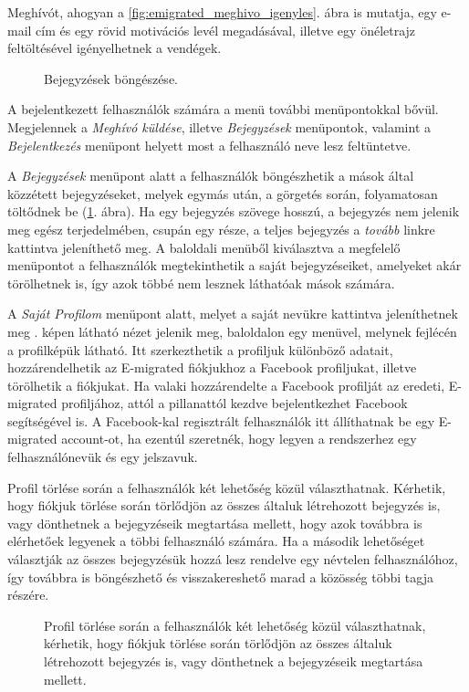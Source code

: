 Meghívót, ahogyan a \ref{fig:emigrated_meghivo_igenyles}. ábra is mutatja, egy e-mail cím és egy rövid motivációs levél megadásával, illetve egy önéletrajz feltöltésével igényelhetnek a vendégek.
\begin{figure}[!b]
  \centering
  \caption{Bejegyzések böngészése.}
  \label{fig:osszes_bejegyzes}
\end{figure}



A bejelentkezett felhasználók számára a menü további menüpontokkal bővül. Megjelennek a \textit{Meghívó küldése}, illetve \textit{Bejegyzések} menüpontok, valamint a \textit{Bejelentkezés} menüpont helyett most a felhasználó neve lesz feltüntetve. 


A \textit{Bejegyzések} menüpont alatt a felhasználók böngészhetik a mások által közzétett bejegyzéseket, melyek egymás után, a görgetés során, folyamatosan töltődnek be (\ref{fig:osszes_bejegyzes}. ábra). Ha egy bejegyzés szövege hosszú, a bejegyzés nem jelenik meg egész terjedelmében, csupán egy része, a teljes bejegyzés a \textit{tovább} linkre kattintva  jeleníthető meg. A baloldali menüből kiválasztva a megfelelő menüpontot a felhasználók megtekinthetik a saját bejegyzéseiket, amelyeket akár  törölhetnek is, így azok többé nem lesznek láthatóak mások számára.


A \textit{Saját Profilom} menüpont alatt, melyet a saját nevükre kattintva jeleníthetnek meg . képen látható nézet jelenik meg, baloldalon egy menüvel, melynek fejlécén a profilképük látható. Itt szerkezthetik a profiljuk különböző adatait, hozzárendelhetik az E-migrated fiókjukhoz a Facebook profiljukat, illetve törölhetik a fiókjukat. Ha valaki hozzárendelte a Facebook profilját az eredeti, E-migrated profiljához, attól a pillanattól kezdve bejelentkezhet Facebook segítségével is. A Facebook-kal regisztrált felhasználók itt állíthatnak be egy E-migrated account-ot, ha ezentúl szeretnék, hogy legyen a rendszerhez egy felhasználónevük és egy jelszavuk.

Profil törlése során a felhasználók két lehetőség közül választhatnak. Kérhetik, hogy fiókjuk törlése során törlődjön az összes általuk létrehozott bejegyzés is, vagy dönthetnek a bejegyzéseik megtartása mellett, hogy azok továbbra is elérhetőek legyenek a többi felhasználó számára. Ha a második lehetőséget választják az összes bejegyzésük hozzá lesz rendelve egy névtelen felhasználóhoz, így továbbra is böngészhető és visszakereshető marad a közösség többi tagja részére.
\begin{figure}
  \centering
  \caption{Profil törlése során a felhasználók két lehetőség közül választhatnak, kérhetik, hogy fiókjuk törlése során törlődjön az összes általuk létrehozott bejegyzés is, vagy dönthetnek a bejegyzéseik megtartása mellett.}
  \label{fig:fiok_torlese}
\end{figure}

